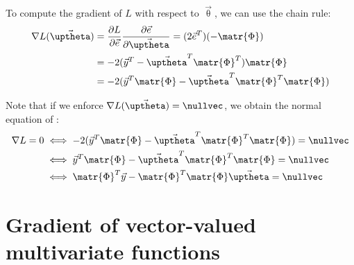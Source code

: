 \begin{description}
        To compute the gradient of $L$ with respect to $\vec{\uptheta}$, we can use the chain rule:
        \[ 
            \begin{split}
                \nabla L(\vec{\uptheta}) &= \frac{\partial L}{\partial \vec{e}} \frac{\partial \vec{e}}{\partial \vec{\uptheta}} 
                        = (2\vec{e}^T) (-\matr{\Phi}) \\
                    & = -2(\vec{y}^T - \vec{\uptheta}^T \matr{\Phi}^T)\matr{\Phi} \\
                    & = -2(\vec{y}^T\matr{\Phi} - \vec{\uptheta}^T \matr{\Phi}^T\matr{\Phi})
            \end{split}
        \]

        Note that if we enforce $\nabla L(\vec{\uptheta}) = \nullvec$, we obtain the normal equation of :
        \[
            \begin{split}
                \nabla L = 0 &\iff -2(\vec{y}^T\matr{\Phi} - \vec{\uptheta}^T \matr{\Phi}^T\matr{\Phi}) = \nullvec \\
                    &\iff \vec{y}^T \matr{\Phi} - \vec{\uptheta}^T \matr{\Phi}^T\matr{\Phi} = \nullvec \\
                    &\iff \matr{\Phi}^T \vec{y} - \matr{\Phi}^T \matr{\Phi} \vec{\uptheta} = \nullvec
            \end{split}
        \]
\end{description}



\section{Gradient of vector-valued multivariate functions}

